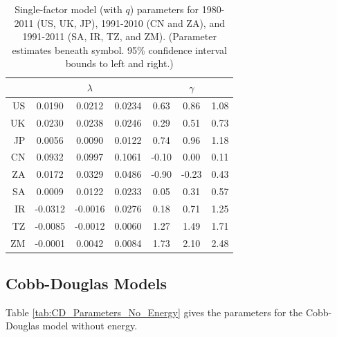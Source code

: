\documentclass[preprint,authoryear,12pt]{elsarticle}\usepackage{graphicx, color}
\makeatletter
\newenvironment{kframe}{%
 \def\at@end@of@kframe{}%
 \ifinner\ifhmode%
  \def\at@end@of@kframe{\end{minipage}}%
  \begin{minipage}{\columnwidth}%
 \fi\fi%
 \def\FrameCommand##1{\hskip\@totalleftmargin \hskip-\fboxsep
 \colorbox{shadecolor}{##1}\hskip-\fboxsep
     \hskip-\linewidth \hskip-\@totalleftmargin \hskip\columnwidth}%
 \MakeFramed {\advance\hsize-\width
   \@totalleftmargin\z@ \linewidth\hsize
   \@setminipage}}%
 {\par\unskip\endMakeFramed%
 \at@end@of@kframe}
\makeatother
\begin{document}
\begin{table}[H]
\begin{center}
\caption{Single-factor model (with $q$) parameters for 1980-2011 (US, UK, JP), 1991-2010 (CN and ZA), and 1991-2011 (SA, IR, TZ, and ZM). (Parameter estimates beneath symbol. 95\% confidence interval bounds to left and right.)}
\label{tab:SF_Parameters_With_Q}
{\tiny
\begin{tabular}{r|ccc|ccc}
  \hline
 &   & $\lambda$ &   &   & $\gamma$ &   \\ 
  \hline
US & 0.0190 & 0.0212 & 0.0234 & 0.63 & 0.86 & 1.08 \\ 
  UK & 0.0230 & 0.0238 & 0.0246 & 0.29 & 0.51 & 0.73 \\ 
  JP & 0.0056 & 0.0090 & 0.0122 & 0.74 & 0.96 & 1.18 \\ 
  CN & 0.0932 & 0.0997 & 0.1061 & -0.10 & 0.00 & 0.11 \\ 
  ZA & 0.0172 & 0.0329 & 0.0486 & -0.90 & -0.23 & 0.43 \\ 
  SA & 0.0009 & 0.0122 & 0.0233 & 0.05 & 0.31 & 0.57 \\ 
  IR & -0.0312 & -0.0016 & 0.0276 & 0.18 & 0.71 & 1.25 \\ 
  TZ & -0.0085 & -0.0012 & 0.0060 & 1.27 & 1.49 & 1.71 \\ 
  ZM & -0.0001 & 0.0042 & 0.0084 & 1.73 & 2.10 & 2.48 \\ 
   \hline
\end{tabular}
}
\end{center}
\end{table}
\begin{kframe}

{\ttfamily\noindent\bfseries\color{errorcolor}{Error: error in evaluating the argument 'x' in selecting a method for function 'print': Error in prof\$getProfile() : \\\ \ step factor 0.000488281 reduced below 'minFactor' of 0.000976562\\Calls: singleFactorParamsTable ... confint.nls -> profile -> profile.nls -> <Anonymous>}}\end{kframe}


\subsection{Cobb-Douglas Models}

Table \ref{tab:CD_Parameters_No_Energy} gives the parameters for the Cobb-Douglas model without energy.
\end{document}
